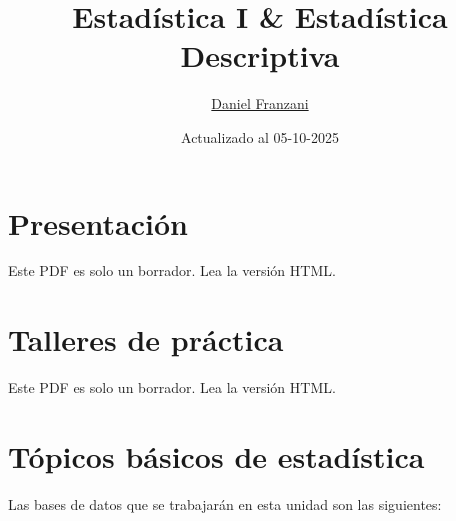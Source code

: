 \documentclass[
  11pt,
]{book}
\title{Estadística I \& Estadística Descriptiva}
\author{\href{https://dfranzani.github.io/website/principal/home.html}{Daniel Franzani}}
\date{Actualizado al 05-10-2025}
\theoremstyle{definition}
\theoremstyle{definition}
\theoremstyle{definition}
\theoremstyle{definition}
\theoremstyle{remark}
\begin{document}
\maketitle

{
\setcounter{tocdepth}{3}
\tableofcontents
}
\chapter*{Presentación}\label{presetacion}

Este PDF es solo un borrador. Lea la versión HTML.

\chapter*{Talleres de práctica}\label{talleres}

Este PDF es solo un borrador. Lea la versión HTML.

\chapter{Tópicos básicos de estadística}\label{unidad1}

Las bases de datos que se trabajarán en esta unidad son las siguientes:
\end{document}

